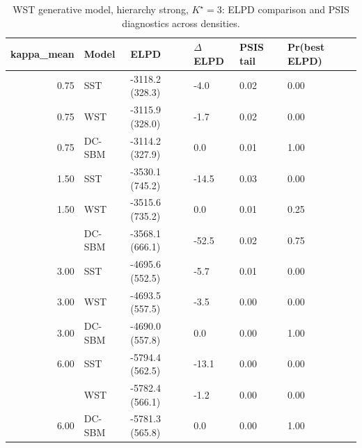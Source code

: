 \begin{table}
\centering
\caption{WST generative model, hierarchy strong, $K^\star=3$: ELPD comparison and PSIS diagnostics across densities.}
\centering
\begin{tabular}[t]{rlllll}
\toprule
kappa_mean & Model & ELPD & $\Delta$ELPD & PSIS tail & Pr(best ELPD)\\
\midrule
0.75 & SST & -3118.2 (328.3) & -4.0 & 0.02 & 0.00\\
0.75 & WST & -3115.9 (328.0) & -1.7 & 0.02 & 0.00\\
0.75 & DC-SBM & -3114.2 (327.9) & 0.0 & 0.01 & 1.00\\
1.50 & SST & -3530.1 (745.2) & -14.5 & 0.03 & 0.00\\
1.50 & WST & -3515.6 (735.2) & 0.0 & 0.01 & 0.25\\
\addlinespace
1.50 & DC-SBM & -3568.1 (666.1) & -52.5 & 0.02 & 0.75\\
3.00 & SST & -4695.6 (552.5) & -5.7 & 0.01 & 0.00\\
3.00 & WST & -4693.5 (557.5) & -3.5 & 0.00 & 0.00\\
3.00 & DC-SBM & -4690.0 (557.8) & 0.0 & 0.00 & 1.00\\
6.00 & SST & -5794.4 (562.5) & -13.1 & 0.00 & 0.00\\
\addlinespace
6.00 & WST & -5782.4 (566.1) & -1.2 & 0.00 & 0.00\\
6.00 & DC-SBM & -5781.3 (565.8) & 0.0 & 0.00 & 1.00\\
\bottomrule
\end{tabular}
\end{table}
